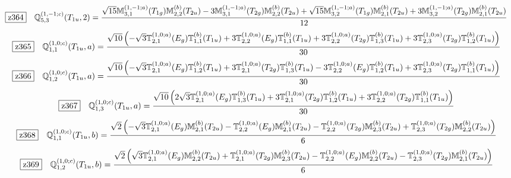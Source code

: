 \documentclass[fleqn,10pt,landscape]{jsarticle}
\begin{document}
\begin{dmath*}
\hspace*{3mm}\fbox{z364}\quad \mathbb{Q}_{5,3}^{(1,-1;c)}(T_{1u},2)=\frac{\sqrt{15} \mathbb{M}_{3,1}^{(1,-1;a)}(T_{1g}) \mathbb{M}_{2,2}^{(b)}(T_{2u}) - 3 \mathbb{M}_{3,1}^{(1,-1;a)}(T_{2g}) \mathbb{M}_{2,2}^{(b)}(T_{2u}) + \sqrt{15} \mathbb{M}_{3,2}^{(1,-1;a)}(T_{1g}) \mathbb{M}_{2,1}^{(b)}(T_{2u}) + 3 \mathbb{M}_{3,2}^{(1,-1;a)}(T_{2g}) \mathbb{M}_{2,1}^{(b)}(T_{2u})}{12}
\end{dmath*}
\begin{dmath*}
\hspace*{3mm}\fbox{z365}\quad \mathbb{Q}_{1,1}^{(1,0;c)}(T_{1u},a)=\frac{\sqrt{10} \left(- \sqrt{3} \mathbb{T}_{2,1}^{(1,0;a)}(E_{g}) \mathbb{T}_{1,1}^{(b)}(T_{1u}) + 3 \mathbb{T}_{2,2}^{(1,0;a)}(E_{g}) \mathbb{T}_{1,1}^{(b)}(T_{1u}) + 3 \mathbb{T}_{2,2}^{(1,0;a)}(T_{2g}) \mathbb{T}_{1,3}^{(b)}(T_{1u}) + 3 \mathbb{T}_{2,3}^{(1,0;a)}(T_{2g}) \mathbb{T}_{1,2}^{(b)}(T_{1u})\right)}{30}
\end{dmath*}
\begin{dmath*}
\hspace*{3mm}\fbox{z366}\quad \mathbb{Q}_{1,2}^{(1,0;c)}(T_{1u},a)=\frac{\sqrt{10} \left(- \sqrt{3} \mathbb{T}_{2,1}^{(1,0;a)}(E_{g}) \mathbb{T}_{1,2}^{(b)}(T_{1u}) + 3 \mathbb{T}_{2,1}^{(1,0;a)}(T_{2g}) \mathbb{T}_{1,3}^{(b)}(T_{1u}) - 3 \mathbb{T}_{2,2}^{(1,0;a)}(E_{g}) \mathbb{T}_{1,2}^{(b)}(T_{1u}) + 3 \mathbb{T}_{2,3}^{(1,0;a)}(T_{2g}) \mathbb{T}_{1,1}^{(b)}(T_{1u})\right)}{30}
\end{dmath*}
\begin{dmath*}
\hspace*{3mm}\fbox{z367}\quad \mathbb{Q}_{1,3}^{(1,0;c)}(T_{1u},a)=\frac{\sqrt{10} \left(2 \sqrt{3} \mathbb{T}_{2,1}^{(1,0;a)}(E_{g}) \mathbb{T}_{1,3}^{(b)}(T_{1u}) + 3 \mathbb{T}_{2,1}^{(1,0;a)}(T_{2g}) \mathbb{T}_{1,2}^{(b)}(T_{1u}) + 3 \mathbb{T}_{2,2}^{(1,0;a)}(T_{2g}) \mathbb{T}_{1,1}^{(b)}(T_{1u})\right)}{30}
\end{dmath*}
\begin{dmath*}
\hspace*{3mm}\fbox{z368}\quad \mathbb{Q}_{1,1}^{(1,0;c)}(T_{1u},b)=\frac{\sqrt{2} \left(- \sqrt{3} \mathbb{T}_{2,1}^{(1,0;a)}(E_{g}) \mathbb{M}_{2,1}^{(b)}(T_{2u}) - \mathbb{T}_{2,2}^{(1,0;a)}(E_{g}) \mathbb{M}_{2,1}^{(b)}(T_{2u}) - \mathbb{T}_{2,2}^{(1,0;a)}(T_{2g}) \mathbb{M}_{2,3}^{(b)}(T_{2u}) + \mathbb{T}_{2,3}^{(1,0;a)}(T_{2g}) \mathbb{M}_{2,2}^{(b)}(T_{2u})\right)}{6}
\end{dmath*}
\begin{dmath*}
\hspace*{3mm}\fbox{z369}\quad \mathbb{Q}_{1,2}^{(1,0;c)}(T_{1u},b)=\frac{\sqrt{2} \left(\sqrt{3} \mathbb{T}_{2,1}^{(1,0;a)}(E_{g}) \mathbb{M}_{2,2}^{(b)}(T_{2u}) + \mathbb{T}_{2,1}^{(1,0;a)}(T_{2g}) \mathbb{M}_{2,3}^{(b)}(T_{2u}) - \mathbb{T}_{2,2}^{(1,0;a)}(E_{g}) \mathbb{M}_{2,2}^{(b)}(T_{2u}) - \mathbb{T}_{2,3}^{(1,0;a)}(T_{2g}) \mathbb{M}_{2,1}^{(b)}(T_{2u})\right)}{6}
\end{dmath*}
\end{document}
